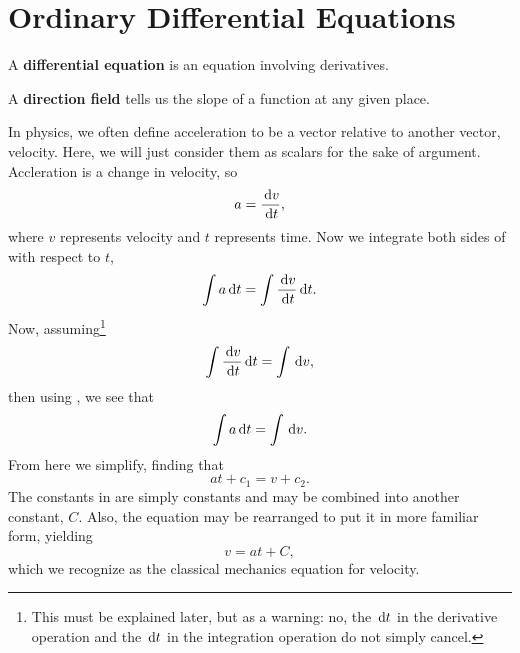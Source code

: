 \chapter{Ordinary Differential Equations}
\begin{defn}
  A \textbf{differential equation} is an equation involving derivatives.
\end{defn}
\begin{defn}
  A \textbf{direction field} tells us the slope of a function at any given place.
\end{defn}
\begin{ex}
    In physics, we often define acceleration to be a vector relative to another 
    vector, velocity.
    Here, we will just consider them as scalars for the sake of argument.
    Accleration is a change in velocity, so
    \begin{equation}
        a = \frac{\,\mathrm{d} v}{\,\mathrm{d} t},
        \label{eq:acceleration}
    \end{equation}
    where $v$ represents velocity and $t$ represents time.
    Now we integrate both sides of  with respect to $t$,
    \begin{equation}
        \int a \,\mathrm{d} t = \int \frac{\,\mathrm{d} v}{\,\mathrm{d} t} \,\mathrm{d} t.
        \label{eq:intaccel}
    \end{equation}
    Now, assuming\footnote{This must be explained later, but as a warning: no,
    the $\,\mathrm{d} t$ in the derivative operation and the $\,\mathrm{d} t$ in the integration 
    operation do not simply cancel.}
    \begin{equation}
        \int \frac{\,\mathrm{d} v}{\,\mathrm{d} t} \,\mathrm{d} t = \int \,\mathrm{d} v,
        \label{eq:handwave}
    \end{equation}
    then using , we see that
    \begin{equation}
        \int a \,\mathrm{d} t = \int \,\mathrm{d} v.
        \label{eq:naughtint}
    \end{equation}
    From here we simplify, finding that
    \begin{equation}
        at + c_1 = v + c_2.
        \label{eq:almostvelocity}
    \end{equation}
    The constants in  are simply constants and may be combined into another constant, $C$.
    Also, the equation may be rearranged to put it in more familiar form, yielding
    \begin{equation}
        v = at + C,
        \label{eq:velocity}
    \end{equation}
    which we recognize as the classical mechanics equation for velocity.

\end{ex}
